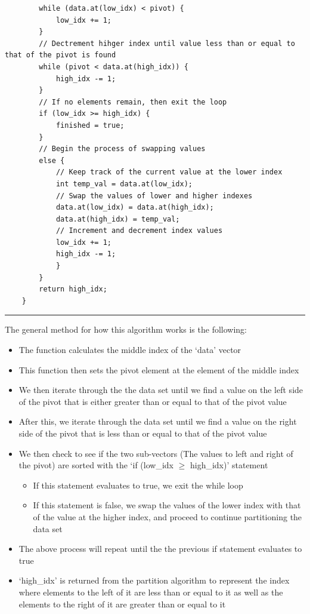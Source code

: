 \documentclass[a4paper,9pt]{article}
\newcommand{\horizontalline}{\noindent \rule{\textwidth}{0.5pt}\par}
\begin{document}
\begin{highlight}
\begin{verbatim}
        while (data.at(low_idx) < pivot) {
            low_idx += 1;
        }
        // Dectrement hihger index until value less than or equal to that of the pivot is found
        while (pivot < data.at(high_idx)) {
            high_idx -= 1;
        }
        // If no elements remain, then exit the loop
        if (low_idx >= high_idx) {
            finished = true;
        }
        // Begin the process of swapping values
        else {
            // Keep track of the current value at the lower index
            int temp_val = data.at(low_idx);
            // Swap the values of lower and higher indexes
            data.at(low_idx) = data.at(high_idx);
            data.at(high_idx) = temp_val;
            // Increment and decrement index values
            low_idx += 1;
            high_idx -= 1;
            }
        }
        return high_idx;
    }
    \end{verbatim}

    \horizontalline

    The general method for how this algorithm works is the following:

    \begin{itemize}
        \item The function calculates the middle index of the `data' vector
        \item This function then sets the pivot element at the element of the middle index
        \item We then iterate through the the data set until we find a value on the left side of the pivot that is either greater than or equal to that of the pivot value
        \item After this, we iterate through the data set until we find a value on the right side of the pivot that is less than or equal to that of the pivot value
        \item We then check to see if the two sub-vectors (The values to left and right of the pivot) are sorted with the `if (low\_idx $\geq$ high\_idx)' statement
        \begin{itemize}
            \item If this statement evaluates to true, we exit the while loop
            \item If this statement is false, we swap the values of the lower index with that of the value at the higher index, and proceed to continue partitioning the data set
        \end{itemize}
        \item The above process will repeat until the the previous if statement evaluates to true
        \item `high\_idx' is returned from the partition algorithm to represent the index where elements to the left of it are less than or equal to it as well as the elements to the right of it are greater than or equal to it
    \end{itemize}


\end{highlight}
\end{document}
